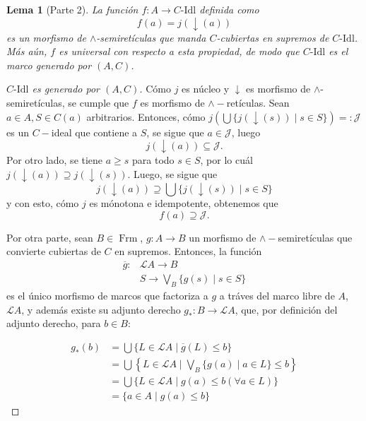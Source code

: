 \documentclass[12pt,letterpaper,titlepage]{article}
\newtheorem*{lemma}{Lema}
\theoremstyle{definition}
\newcommand\down{{\downarrow}}
\renewcommand\inf{\wedge}
\newcommand\<{\langle}
\renewcommand\>{\rangle}
\newcommand\Idl{\text{-}\mathrm{Idl}}
\DeclareMathOperator{\Frm}{Frm}
\begin{document}
\begin{lemma}[Parte 2]
    La función $f:A\to C\Idl$ definida como
    \begin{equation*}
        f(a)=j(\down(a))
    \end{equation*}
    es un morfismo de $\inf$-semiretículas que
    manda $C$-cubiertas en supremos de $C\Idl$.
    Más aún, $f$ es universal con respecto a esta propiedad,
    de modo que $C\Idl$ es el marco generado por $(A,C)$.
\end{lemma}

\begin{proof}[$C\Idl$ es generado por $(A,C)$]
    Cómo $j$ es núcleo y $\down$ es morfismo
    de $\inf$-semiretículas,
    se cumple que $f$ es morfismo de $\inf-$retículas.
    Sean $a\in A,S\in C(a)$ arbitrarios. Entonces, cómo $j(\bigcup\{j(\down(s))\mid s\in S\})=:\mathcal{J}$ es un $C-$ideal que contiene a $S$, se sigue que $a\in\mathcal{J}$, luego 
    \begin{equation*}
        j(\down(a))\subseteq \mathcal{J}.
    \end{equation*}
    Por otro lado, se tiene $a\geq s$ para todo $s\in S$, por lo cuál $j(\down(a))\supseteq j(\down(s))$. Luego, se sigue que
    \begin{equation*}
        j(\down(a))\supseteq \bigcup\{j(\down(s))\mid s\in S\}
    \end{equation*}
    y con esto, cómo $j$ es mónotona e idempotente, obtenemos que
    \begin{equation*}
        f(a)\supseteq\mathcal{J}.
    \end{equation*}

    Por otra parte, sean $B\in\Frm$, $g:A\to B$ un morfismo de $\wedge-$semiretículas que convierte cubiertas de $C$ en supremos. Entonces, la función 
    \begin{align*}
        \overline{g}: &\mathcal{L}A\to B \\
                      & S\to \bigvee_B\{g(s)\mid s\in S\}
    \end{align*}
    es el único morfismo de marcos que factoriza a $g$ a tráves del marco libre de $A$, $\mathcal{L}A$, y además existe su adjunto derecho $g_*:B\to\mathcal{L}A$, que, por definición del adjunto derecho, para $b\in B:$

    \begin{align*}
        g_*(b) & = \bigcup\{L\in\mathcal{L}A\mid\overline{g}(L)\leq b\} \\
               & = \bigcup\left\{L\in\mathcal{L}A\mid \bigvee_B\{g(a)\mid a\in L\}\leq b\right\} \\
               & = \bigcup\{L\in\mathcal{L}A\mid g(a)\leq b (\forall a \in L)\} \\
               & = \{a\in A\mid g(a)\leq b\} 
    \end{align*}


\end{proof}
\end{document}
